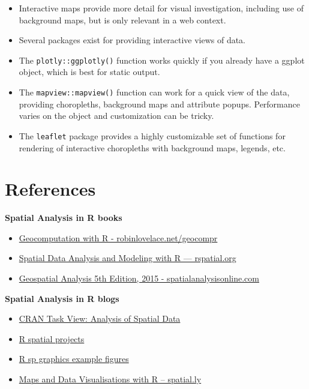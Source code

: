 \documentclass[]{book}
\providecommand{\tightlist}{%
  \setlength{\itemsep}{0pt}\setlength{\parskip}{0pt}}
\theoremstyle{definition}
\theoremstyle{definition}
\theoremstyle{definition}
\theoremstyle{remark}
\begin{document}
\begin{itemize}
\tightlist
\item
  Interactive maps provide more detail for visual investigation,
  including use of background maps, but is only relevant in a web
  context.
\item
  Several packages exist for providing interactive views of data.
\item
  The \texttt{plotly::ggplotly()} function works quickly if you already
  have a ggplot object, which is best for static output.
\item
  The \texttt{mapview::mapview()} function can work for a quick view of
  the data, providing choropleths, background maps and attribute popups.
  Performance varies on the object and customization can be tricky.
\item
  The \texttt{leaflet} package provides a highly customizable set of
  functions for rendering of interactive choropleths with background
  maps, legends, etc.
\end{itemize}

\chapter*{References}\label{references}

\textbf{Spatial Analysis in R books}

\begin{itemize}
\tightlist
\item
  \href{http://robinlovelace.net/geocompr/}{Geocomputation with R -
  robinlovelace.net/geocompr}
\item
  \href{http://www.rspatial.org/}{Spatial Data Analysis and Modeling
  with R --- rspatial.org}
\item
  \href{http://www.spatialanalysisonline.com/HTML/index.html}{Geospatial
  Analysis 5th Edition, 2015 - spatialanalysisonline.com}
\end{itemize}

\textbf{Spatial Analysis in R blogs}

\begin{itemize}
\tightlist
\item
  \href{https://cran.r-project.org/web/views/Spatial.html}{CRAN Task
  View: Analysis of Spatial Data}
\item
  \href{http://rspatial.r-forge.r-project.org/}{R spatial projects}
\item
  \href{http://rspatial.r-forge.r-project.org/gallery/}{R sp graphics
  example figures}
\item
  \href{http://spatial.ly/r/}{Maps and Data Visualisations with R --
  spatial.ly}
\end{itemize}
\end{document}
